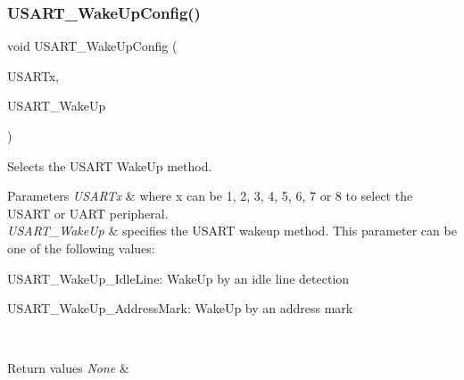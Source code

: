 \subsubsection{\texorpdfstring{U\+S\+A\+R\+T\+\_\+\+Wake\+Up\+Config()}{USART\_WakeUpConfig()}}
{\footnotesize\ttfamily void U\+S\+A\+R\+T\+\_\+\+Wake\+Up\+Config (\begin{DoxyParamCaption}\item[{U\+S\+A\+R\+T\+\_\+\+Type\+Def $\ast$}]{U\+S\+A\+R\+Tx,  }\item[{uint16\+\_\+t}]{U\+S\+A\+R\+T\+\_\+\+Wake\+Up }\end{DoxyParamCaption})}



Selects the U\+S\+A\+RT Wake\+Up method. 


\begin{DoxyParams}{Parameters}
{\em U\+S\+A\+R\+Tx} & where x can be 1, 2, 3, 4, 5, 6, 7 or 8 to select the U\+S\+A\+RT or U\+A\+RT peripheral. \\
\hline
{\em U\+S\+A\+R\+T\+\_\+\+Wake\+Up} & specifies the U\+S\+A\+RT wakeup method. This parameter can be one of the following values\+: \begin{DoxyItemize}
\item U\+S\+A\+R\+T\+\_\+\+Wake\+Up\+\_\+\+Idle\+Line\+: Wake\+Up by an idle line detection \item U\+S\+A\+R\+T\+\_\+\+Wake\+Up\+\_\+\+Address\+Mark\+: Wake\+Up by an address mark \end{DoxyItemize}
\\
\hline
\end{DoxyParams}

\begin{DoxyRetVals}{Return values}
{\em None} & \\
\hline
\end{DoxyRetVals}
